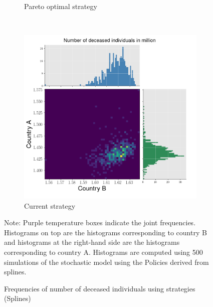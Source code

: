 \begin{figure}[h!]
\begin{subfigure}[b]{0.49\textwidth}
         \caption{Pareto optimal strategy}
         \label{fig:2d_optimal}
     \end{subfigure}
     \\
     \begin{subfigure}[b]{0.49\textwidth}
         \centering
         \includegraphics[width=\textwidth]{images/splines_stochastic_histogram_deceased_current.png}
         \caption{Current strategy}
         \label{fig:2d_current}
     \end{subfigure}
\begin{flushleft}
\scriptsize{Note:} Purple temperature boxes indicate the joint frequencies. Histograms on top are the histograms corresponding to country B and histograms at the right-hand side are the histograms corresponding to country A. Histograms are computed using 500 simulations of the stochastic model using the Policies derived from splines. 
\end{flushleft}
        \caption{Frequencies of number of deceased individuals using strategies (Splines)}
        \label{fig:histograms} 
\end{figure}

